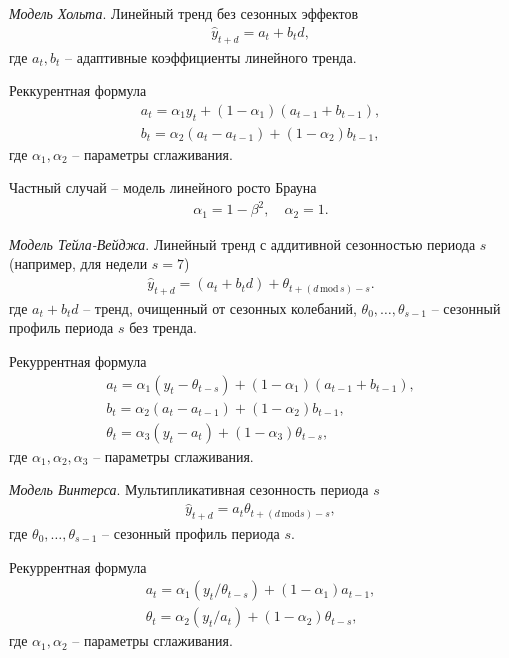 \documentclass[%
	11pt,
	a4paper,
	utf8,
		]{article}
\begin{document}
\emph{Модель Хольта}. Линейный тренд без сезонных эффектов
\begin{align*}
	\hat{y}_{t + d} = a_t + b_t d,
\end{align*}
где $ a_t, b_t $ -- адаптивные коэффициенты линейного тренда.

Реккурентная формула
\begin{align*}
	a_t = \alpha_1 y_t + (1 - \alpha_1)(a_{t - 1} + b_{t - 1}),\\
	b_t = \alpha_2 (a_t - a_{t - 1}) + (1 - \alpha_2) b_{t - 1},
\end{align*}
где $ \alpha_1, \alpha_2 $ -- параметры сглаживания.

Частный случай -- модель линейного росто Брауна
\begin{align*}
	\alpha_1 = 1 - \beta^2, \quad \alpha_2 = 1.
\end{align*}

\emph{Модель Тейла-Вейджа}. Линейный тренд с аддитивной сезонностью периода $ s $ (например, для недели $ s = 7 $)
\begin{align*}
	\hat{y}_{t + d} = (a_t + b_t d) + \theta_{t + (d \, \text{mod} \, s) - s }.
\end{align*}
где $ a_t + b_t d $ -- тренд, очищенный от сезонных колебаний, $ \theta_0, \ldots, \theta_{s - 1} $ -- сезонный профиль периода $ s $ без тренда.

Рекуррентная формула
\begin{align*}
	a_t = \alpha_1 (y_t - \theta_{t - s}) + (1 - \alpha_1)(a_{t - 1} + b_{t - 1}),\\
	b_t = \alpha_2 (a_t - a_{t - 1}) + (1 - \alpha_2) b_{t - 1}, \\
	\theta_t = \alpha_3 (y_t - a_t) + (1 - \alpha_3) \theta_{t - s},
\end{align*}
где $ \alpha_1, \alpha_2, \alpha_3 $ -- параметры сглаживания.

\emph{Модель Винтерса}. Мультипликативная сезонность периода $ s $
\begin{align*}
	\hat{y}_{t + d} = a_t \theta_{t + (d \, \text{mod} s) - s},
\end{align*}
где $ \theta_0, \ldots, \theta_{s - 1} $ -- сезонный профиль периода $ s $.

Рекуррентная формула
\begin{align*}
	a_t = \alpha_1 (y_t / \theta_{t - s}) + (1 - \alpha_1) a_{t - 1},\\
	\theta_t = \alpha_2 (y_t / a_t) + (1 - \alpha_2) \theta_{ t - s},
\end{align*}
где $ \alpha_1, \alpha_2 $ -- параметры сглаживания.
\end{document}
